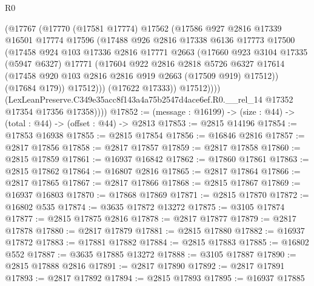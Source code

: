 \begin{lexlean}{R0}
\begin{coremodule}
                (@17767
                  (@17770
                    (@17581 @17774)
                    @17562
                    (@17586
                      @927
                      @2816
                      @17339
                      @16501
                      @17774
                      @17596
                      (@17488
                        @926
                        @2816
                        @17338
                        @6136
                        @17773
                        @17500
                        (@17458
                          @924
                          @103
                          @17336
                          @2816
                          @17771
                          @2663
                          (@17660
                            @923
                            @3104
                            @17335
                            (@5947 @6327)
                            @17771
                            (@17604
                              @922
                              @2816
                              @2818
                              @5726
                              @6327
                              @17614
                              (@17458 @920 @103 @2816 @2816 @919 @2663 (@17509 @919) @17512))
                            (@17684 @179))
                          @17512)))
                    (@17622 @17333))
                  @17512))))
          (LexLeanPreserve.C349e35acc8f143a4a75b2547d4ace6ef.R0.__rel_14
            @17352
            @17354
            @17356
            @17358))))
@17852 := (message : @16199) -> (size : @44) -> (total : @44) -> (offset : @44) -> @2813
@17853 := @2815 @14196
@17854 := @17853 @16938
@17855 := @2815 @17854
@17856 := @16846 @2816
@17857 := @2817 @17856
@17858 := @2817 @17857
@17859 := @2817 @17858
@17860 := @2815 @17859
@17861 := @16937 @16842
@17862 := @17860 @17861
@17863 := @2815 @17862
@17864 := @16807 @2816
@17865 := @2817 @17864
@17866 := @2817 @17865
@17867 := @2817 @17866
@17868 := @2815 @17867
@17869 := @16937 @16803
@17870 := @17868 @17869
@17871 := @2815 @17870
@17872 := @16802 @535
@17874 := @3635 @17872 @13272
@17875 := @3105 @17874
@17877 := @2815 @17875 @2816
@17878 := @2817 @17877
@17879 := @2817 @17878
@17880 := @2817 @17879
@17881 := @2815 @17880
@17882 := @16937 @17872
@17883 := @17881 @17882
@17884 := @2815 @17883
@17885 := @16802 @552
@17887 := @3635 @17885 @13272
@17888 := @3105 @17887
@17890 := @2815 @17888 @2816
@17891 := @2817 @17890
@17892 := @2817 @17891
@17893 := @2817 @17892
@17894 := @2815 @17893
@17895 := @16937 @17885

\end{coremodule}
\end{lexlean}
